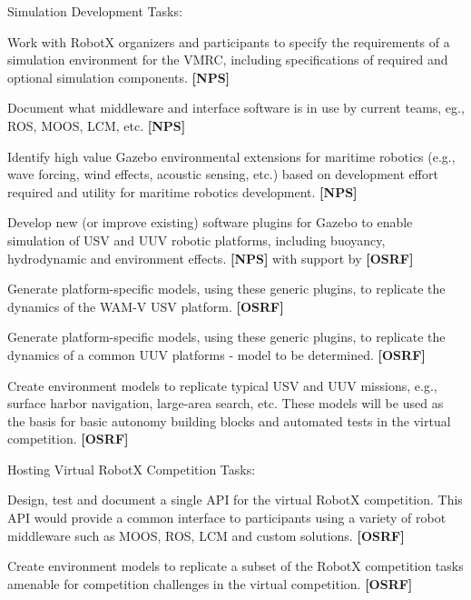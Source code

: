 \documentclass[11pt]{article}
\begin{document}
\begin{sow}
\item Simulation Development Tasks:
  \begin{sow}
  \item Work with RobotX organizers and participants to specify the requirements of a simulation environment for the VMRC, including specifications of required and optional simulation components. {\bf[NPS]}
    \begin{sow}
    \item Document what middleware and interface software is in use by current teams, eg., ROS, MOOS, LCM, etc.  {\bf[NPS]}
    \item Identify high value Gazebo environmental extensions for maritime robotics (e.g., wave forcing, wind effects, acoustic sensing, etc.) based on development effort required and utility for maritime robotics development.  {\bf[NPS]}
    \end{sow}
  \item Develop new (or improve existing) software plugins for Gazebo to enable simulation of USV and UUV robotic platforms, including buoyancy, hydrodynamic and environment effects. {\bf[NPS]} with support by {\bf[OSRF]}
    \begin{sow}
      \item Generate platform-specific models, using these generic plugins, to replicate the dynamics of the WAM-V USV platform. {\bf[OSRF]}
      \item Generate platform-specific models, using these generic plugins, to replicate the dynamics of a common UUV platforms - model to be determined. {\bf[OSRF]}
    \end{sow}
  \item Create environment models to replicate typical USV and UUV missions, e.g., surface harbor navigation, large-area search, etc.  These models will be used as the basis for basic autonomy building blocks and automated tests in the virtual competition. {\bf[OSRF]}
  \end{sow}
\item Hosting Virtual RobotX Competition Tasks:
  \begin{sow}
  \item Design, test and document a single API for the virtual RobotX competition.  This API would provide a common interface to participants using a variety of robot middleware such as MOOS, ROS, LCM and custom solutions. {\bf[OSRF]}
  \item Create environment models to replicate a subset of the RobotX competition tasks amenable for competition challenges in the virtual competition. {\bf[OSRF]}

\end{sow}
\end{sow}
\end{document}
